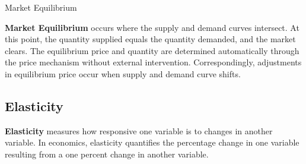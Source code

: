\documentclass[10pt]{article}
\begin{document}
  \begin{core}[label=core:market_eq]{Market Equilibrium}

    \textbf{Market Equilibrium} occurs where the supply and demand curves intersect. At this point, the quantity supplied equals the quantity demanded, and the market clears. The equilibrium price and quantity are determined automatically through the price mechanism without external intervention. Correspondingly, adjustments in equilibrium price occur when supply and demand curve shifts.


  \end{core}

  \subsection{Elasticity}

    \textbf{Elasticity} measures how responsive one variable is to changes in another variable. In economics, elasticity quantifies the percentage change in one variable resulting from a one percent change in another variable.
\end{document}
